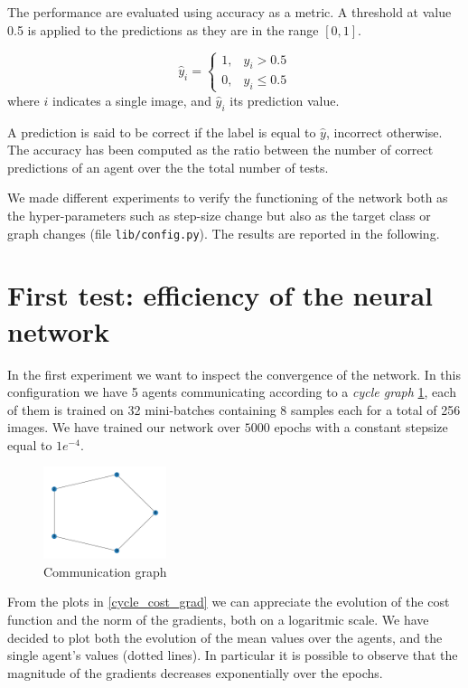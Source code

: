 \documentclass[a4paper,11pt,oneside]{book}
\begin{document}
\bigskip
The performance are evaluated using accuracy as a metric. A threshold at value 0.5 is applied to the predictions as they are in the range $[0, 1]$.

\begin{equation}
\hat{y}_i = 
\begin{cases}
1, & \hat{y}_i > 0.5 \\
0, & \hat{y}_i \le 0.5
\end{cases}
\end{equation}
where $i$ indicates a single image, and $\hat{y}_i$ its prediction value.

\bigskip
A prediction is said to be correct if the label is equal to $\hat{y}$, incorrect otherwise.
The accuracy has been computed as the ratio between the number of correct predictions of an agent over the the total number of tests.

\bigskip
We made different experiments to verify the functioning of the network both as the hyper-parameters such as step-size change but also as the target class or graph changes (file \texttt{lib/config.py}). The results are reported in the following.

\newpage
\section{First test: efficiency of the neural network}
In the first experiment we want to inspect the convergence of the network. In this configuration we have 5 agents communicating according to a \textit{cycle graph} \ref{cycle_graph}, each of them is trained on 32 mini-batches containing 8 samples each for a total of 256 images. 
We have trained our network over $5000$ epochs with a constant stepsize equal to $1e^{-4}$.

\begin{figure}[h]
    \centering
    \includegraphics[width=0.32\textwidth]{cycle/graph}
    \caption{Communication graph}
    \label{cycle_graph}
\end{figure}

From the plots in \ref{cycle_cost_grad} we can appreciate the evolution of the cost function and the norm of the gradients, both on a logaritmic scale. We have decided to plot both the evolution of the mean values over the agents, and the single agent's values (dotted lines). In particular it is possible to observe that the magnitude of the gradients decreases exponentially over the epochs.
\end{document}
